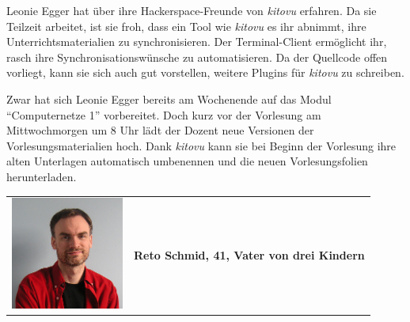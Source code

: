 \documentclass[a4paper]{article}
\begin{document}
\begin{description}[uclist]
	\item[Erwartungen an \emph{kitovu}] Leonie Egger hat über ihre Hackerspace-Freunde von \emph{kitovu} erfahren. Da sie Teilzeit arbeitet, ist sie froh, dass ein Tool wie \emph{kitovu} es ihr abnimmt, ihre Unterrichtsmaterialien zu synchronisieren. Der Terminal-Client ermöglicht ihr, rasch ihre Synchronisationswünsche zu automatisieren. Da der Quellcode offen vorliegt, kann sie sich auch gut vorstellen, weitere Plugins für \emph{kitovu} zu schreiben.
	\item[Szenario: ``Kurzfristige Änderungen''] Zwar hat sich Leonie Egger bereits am Wochenende auf das Modul ``Computernetze 1'' vorbereitet. Doch kurz vor der Vorlesung am Mittwochmorgen um 8 Uhr lädt der Dozent neue Versionen der Vorlesungsmaterialien hoch. Dank \emph{kitovu} kann sie bei Beginn der Vorlesung ihre alten Unterlagen automatisch umbenennen und die neuen Vorlesungsfolien herunterladen.
\end{description}

\pagebreak
\begin{tabulary}{\linewidth}{m{10em}l}
	\includegraphics[width=10em]{../../img/userpersonaimages02.png} & \textbf{{\large Reto Schmid, 41, Vater von drei Kindern}} \\
\end{tabulary}
\end{document}
